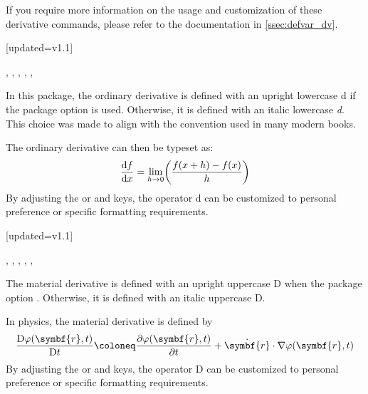 If you require more information on the usage and customization of these derivative commands, please refer to the documentation in \cref{ssec:defvar_dv}.

\clearpage
\begin{function}{\odv}[updated=v1.1]
	\begin{syntax}
		\sarg, , , \targ{/}, , 
	\end{syntax}
	In this package, the ordinary derivative is defined with an upright lowercase d if the package option  is used. Otherwise, it is defined with an italic lowercase \textit{d}. This choice was made to align with the convention used in many modern books.
	\begin{definition}
	\end{definition}

	\noindent The ordinary derivative can then be typeset as:
	\begin{equation*}
		\odv{f}{x} = \lim_{h\to 0} \mleft( \frac{ f(x+h) - f(x) }{ h } \mright)
	\end{equation*}
	By adjusting the  or  and  keys, the operator d can be customized to personal preference or specific formatting requirements.
\end{function}

\begin{function}{\mdv}[updated=v1.1]
	\begin{syntax}
		\sarg, , , \targ{/}, , \earg{\_, point\tsb{1}, \^, point\tsb{2}}
	\end{syntax}
	The material derivative is defined with an upright uppercase D when the package option . Otherwise, it is defined with an italic uppercase D.
	\begin{definition}
	\end{definition}
	
	\noindent In physics, the material derivative is defined by
	\begin{equation*}
		\mdv{ \varphi(\symbf{r}, t) }{ t } \coloneq \pdv{ \varphi(\symbf{r}, t) }{ t } + \dot{\symbf{r}} \cdot \nabla \varphi(\symbf{r}, t)
	\end{equation*}
	By adjusting the  or  and  keys, the operator D can be customized to personal preference or specific formatting requirements.
\end{function}

